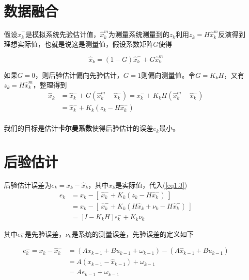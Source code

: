 \section{数据融合}

假设$\hat{x}^{-}_k$是模拟系统先验估计值，$\hat{x}^m_k$为测量系统测量到的$z_k$利用$z_k=H\hat{x}^m_k$反演得到理想实际值，也就是说这是测量值，假设系数矩阵$G$使得

\begin{equation}
    \hat{x}_k=(1-G)\hat{x}^{-}_k+G \hat{x}^m_k
\end{equation}

如果$G=0$，则后验估计偏向先验估计，$G=1$则偏向测量值。令$G=K_kH$，又有$z_k=H\hat{x}^{m}_k$，整理得到
\begin{equation}
    \begin{aligned}
        \hat{x}_k&=\hat{x}^{-}_k+G(\hat{x}^{m}_k-\hat{x}^{-}_k)=\hat{x}^{-}_k+K_kH(\hat{x}^{m}_k-\hat{x}^{-}_k)\\
        &=\hat{x}^{-}_k+K_k(z_k-H\hat{x}^{-}_k)\\
    \end{aligned}
    \label{eq1.3}
\end{equation}

我们的目标是估计\textbf{卡尔曼系数}使得后验估计的误差$e_k$最小。

\section{后验估计}

后验估计误差为$e_k=x_k-\hat{x}_k$，其中$x_k$是实际值，代入(\ref{eq1.3})
\begin{equation}
    \begin{aligned}
        e_k&=x_k-\left[\ \hat{x}^{-}_k+K_k(z_k-H\hat{x}^{-}_k)\ \right]\\
        &=x_k-\left[\ \hat{x}^{-}_k+K_k(H\hat{x}_k+\nu_k-H\hat{x}^{-}_k)\ \right]\\
        &=[I-K_kH]e^{-}_k+K_k\nu_k
    \end{aligned}
\end{equation}

其中$e^{-}_k$是先验误差，$\nu_k$是系统的测量误差，先验误差的定义如下

\begin{equation}
    \begin{aligned}
        e^{-}_k=x_k-\hat{x}^{-}_k&=(Ax_{k-1}+Bu_{k-1}+\omega_{k-1})-(A\hat{x}_{k-1}+Bu_{k-1})\\  
        &=A(x_{k-1}-\hat{x}_{k-1})+\omega_{k-1}\\
        &=Ae_{k-1}+\omega_{k-1}
    \end{aligned}
\end{equation}

